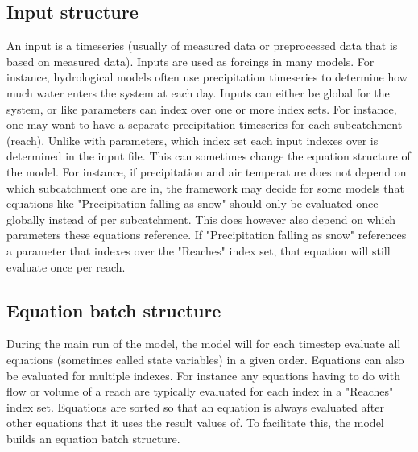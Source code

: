 \documentclass[11pt]{article}
\theoremstyle{definition}
\begin{document}
\subsection{Input structure}
An input is a timeseries (usually of measured data or preprocessed data that is based on measured data). Inputs are used as forcings in many models. For instance, hydrological models often use precipitation timeseries to determine how much water enters the system at each day. Inputs can either be global for the system, or like parameters can index over one or more index sets. For instance, one may want to have a separate precipitation timeseries for each subcatchment (reach). Unlike with parameters, which index set each input indexes over is determined in the input file. This can sometimes change the equation structure of the model. For instance, if precipitation and air temperature does not depend on which subcatchment one are in, the framework may decide for some models that equations like "Precipitation falling as snow" should only be evaluated once globally instead of per subcatchment. This does however also depend on which parameters these equations reference. If "Precipitation falling as snow" references a parameter that indexes over the "Reaches" index set, that equation will still evaluate once per reach.

\subsection{Equation  batch structure}
During the main run of the model, the model will for each timestep evaluate all equations (sometimes called state variables) in a given order. Equations can also be evaluated for multiple indexes. For instance any equations having to do with flow or volume of a reach are typically evaluated for each index in a "Reaches" index set. Equations are sorted so that an equation is always evaluated after other equations that it uses the result values of. To facilitate this, the model builds an equation batch structure.
\end{document}
